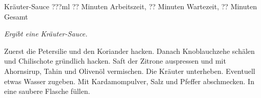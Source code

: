 \begin{recipe}{Kräuter-Sauce} {???ml} {?? Minuten Arbeitszeit, ?? Minuten Wartezeit, ?? Minuten Gesamt}

  \freeform{}\textit{Ergibt eine Kräuter-Sauce.}


  Zuerst die Petersilie und den Koriander hacken.
  Danach Knoblauchzehe schälen und Chilischote gründlich hacken.
  Saft der Zitrone auspressen und mit Ahornsirup, Tahin und Olivenöl vermischen.
  Die Kräuter unterheben.
  Eventuell etwas Wasser zugeben.
  Mit Kardamompulver, Salz und Pfeffer abschmecken.
  In eine saubere Flasche füllen.

  \freeform{}\hrulefill{}

\end{recipe}
